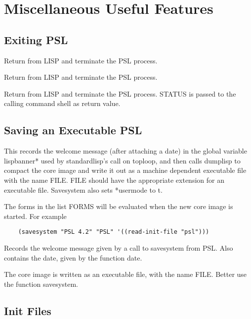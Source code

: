 \chapter{Miscellaneous Useful Features}

\section{Exiting PSL}

{    Return  from  LISP  and  terminate  the PSL process.  }

{  Return  from  LISP  and  terminate  the PSL process.  }

{  Return  from  LISP  and  terminate  the PSL process.
   STATUS is passed to the calling command shell as return value.  }

\section{Saving an Executable PSL}

 {    
    This records the welcome message (after attaching a date) in
    the  global variable lispbanner* used by standardlisp's call
    on toploop, and then calls  dumplisp  to  compact  the  core
    image  and  write  it  out as a machine dependent executable
    file with the name FILE.  FILE should have  the  appropriate
    extension  for  an  executable  file.   Savesystem also sets
    *usermode to t.
}

    The forms in the list FORMS will be evaluated when  the  new
    core image is started.  For example

\begin{verbatim}
    (savesystem "PSL 4.2" "PSL" '((read-init-file "psl")))
\end{verbatim}
{
    Records  the  welcome  message given by a call to savesystem
    from PSL.  Also contains  the date, given  by  the  function
    date.  }

{    The  core  image  is written as an executable file, with the
    name FILE. Better use the function savesystem.
}
\section{Init Files}


